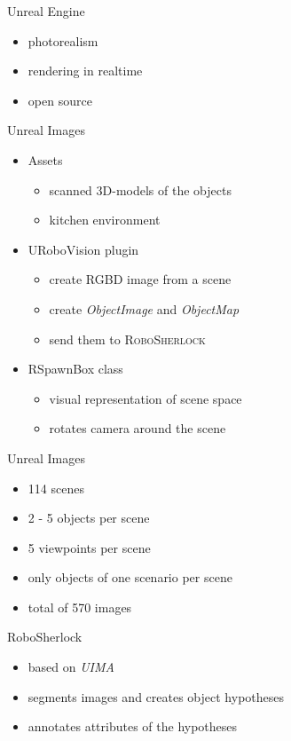 \documentclass[]{beamer}
\begin{document}
\begin{frame}{Unreal Engine}
	\begin{itemize}
		\item photorealism
		\item rendering in realtime
		\item open source
	\end{itemize}
\end{frame}

\begin{frame}{Unreal Images}
	\begin{itemize}
		\item Assets
			\begin{itemize}
				\item scanned 3D-models of the objects
				\item kitchen environment
			\end{itemize}
		\item URoboVision plugin
			\begin{itemize}
				\item create RGBD image from a scene
				\item create \textit{ObjectImage} and  \textit{ObjectMap} 
				\item send them to \textsc{RoboSherlock}
			\end{itemize}
		\item RSpawnBox class
			\begin{itemize}
				\item visual representation of scene space
				\item rotates camera around the scene
			\end{itemize}
	\end{itemize}
\end{frame}

\begin{frame}{Unreal Images}
	\begin{itemize}
		\item 114 scenes
		\item 2 - 5 objects per scene
		\item 5 viewpoints per scene
		\item only objects of one scenario per scene
		\item total of 570 images
	\end{itemize}
\end{frame}


\begin{frame}{RoboSherlock}
	\begin{itemize}
		\item based on \textit{UIMA}
		\item segments images and creates object hypotheses
		\item annotates attributes of the hypotheses
	\end{itemize}
\end{frame}
\end{document}
